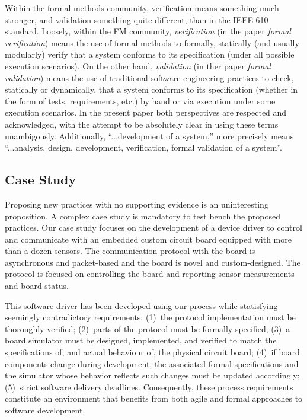\documentclass[english]{lni}
\begin{document}
Within the formal methods community, verification means something much stronger, and validation something quite different, than in the IEEE 610 standard.
Loosely, within the FM community, \emph{verification} (in the paper \emph{formal verification}) means the use of formal methods to formally, statically (and usually modularly) verify that a system conforms to its specification (under all possible execution scenarios).  
On the other hand, \emph{validation} (in ther paper \emph{formal validation}) means the use of traditional software engineering practices to check, statically or dynamically, that a system conforms to its specification (whether in the form of tests, requirements, etc.) by hand or via execution under some execution scenarios.
In the present paper both perspectives are respected and acknowledged, with the attempt to be absolutely clear in using these terms unambigously.
Additionally, ``...development of a system,'' more precisely means ``...analysis, design, development, verification, formal validation of a system''.



\subsection{Case Study}
\label{sec:case-study}

Proposing new practices with no supporting evidence is an uninteresting proposition.  
A complex case study is mandatory to test bench the proposed practices.  
Our case study focuses on the development of a device driver to control and communicate with an embedded custom circuit board equipped with more than a dozen sensors.
The communication protocol with the board is asynchronous and packet-based and the board is novel and custom-designed.  
The protocol is focused on controlling the board and reporting sensor measurements and board status.

This software driver has been developed using our process while statisfying seemingly contradictory requirements: (1)~the protocol implementation must be thoroughly verified; (2)~parts of the protocol must be formally specified; (3)~a board simulator must be designed, implemented, and verified to match the specifications of, and actual behaviour of, the physical circuit board; (4)~if board components change during development, the associated formal specifications and the simulator whose behavior reflects such changes must be updated accordingly; (5)~strict software delivery deadlines.  
Consequently, these process requirements constitute an environment that benefits from both agile and formal approaches to software development.
\end{document}
